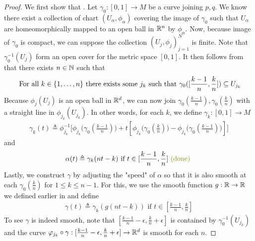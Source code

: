 \documentclass{report}
\begin{document}
\begin{proof}
  We first show that . Let $\gamma_0:[0,1]\rightarrow M$ be a curve joining $p,q$. We know there exist a collection of chart  $(U_\alpha ,\phi_\alpha )$ covering the image of $\gamma_0$ such that $U_\alpha $ are homeomorphically mapped to an open ball in $\mathbb{R}^n$ by  $\phi_\alpha $. Now, because image of $\gamma _0$ is compact, we can suppose the collection $(U_j,\phi_j)_{j=1}^N$ is finite. Note that $\gamma _0^{-1}(U_j)$ form an open cover for the metric space $[0,1]$. It then follows from  that there exists $n\in\mathbb{N}$ such that  \begin{align*}
\text{ For all $k\in \{ 1,\dots ,n \}$ there exists some $j_k$ such that }\gamma_0([\frac{k-1}{n},\frac{k}{n}])\subseteq U_{j_k}  
\end{align*}
Because $\phi_j(U_j)$ is an open ball in $\mathbb{R}^d$, we can now join  $\gamma_0 (\frac{k-1}{n}),\gamma _0 (\frac{k}{n})$ with a straight line in $\phi_{{j_k}}(U_{j_k})$. In other words, for each $k$, we define $\gamma _k:[0,1]\rightarrow M$ 
\begin{align*}
  \gamma_k (t)\triangleq \phi_{j_k}^{-1}\Big[\phi_{j_k}\Big(\gamma_0 (\frac{k-1}{n})\Big)+ t[\phi_{j_k}\Big(\gamma_0 (\frac{k}{n}) \Big) - \phi_{j_k}\Big(\gamma_0 (\frac{k-1}{n}) \Big)] \Big]
\end{align*}
and 
\begin{align*}
\alpha (t)\triangleq \gamma_k (nt-k)\text{ if }t\in [\frac{k-1}{n}, \frac{k}{n}] \odone
\end{align*}
Lastly, we construct $\gamma $ by adjusting the "speed" of $\alpha $ so that it is also smooth at each $\gamma_0 (\frac{k}{n})$ for $1\leq k\leq n-1$. For this, we use the smooth function $g:\mathbb{R}\rightarrow \mathbb{R}$ we defined earlier in  and define 
\begin{align*}
\gamma (t)\triangleq \gamma_k (g(nt-k))\text{ if }t\in [\frac{k-1}{n}, \frac{k}{n}] 
\end{align*}
To see $\gamma $ is indeed smooth, note that $[ \frac{k-1}{n}-\epsilon , \frac{k}{n}+ \epsilon ]$ is contained by  $\gamma_0^{-1}(U_{j_k})$ and the curve $\varphi_{j_k}\circ \gamma : [\frac{k-1}{n}-\epsilon , \frac{k}{n}+\epsilon ]\rightarrow \mathbb{R}^d$ is smooth for each $n$. 
\end{proof}
\end{document}
